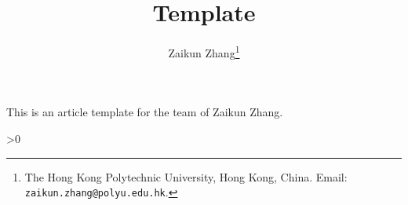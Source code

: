 \documentclass[12pt,a4paper,draft]{article}  %
\title{Template}
\date{\DTMnow}
\author{
    Zaikun Zhang\thanks{The Hong Kong Polytechnic University, Hong Kong, China. Email:
    \texttt{zaikun.zhang@polyu.edu.hk}.}
}
\newcommand{\bibfile}{\jobname.bib}  %
\newcounter{cite}
\theoremstyle{definition}
\numberwithin{equation}{section}
\begin{document}
\maketitle



This is an article template for the team of Zaikun Zhang.

\cite{Zhang_2014}

\ifnum\value{cite}>0
    \small
    
    
\fi

\end{document}

